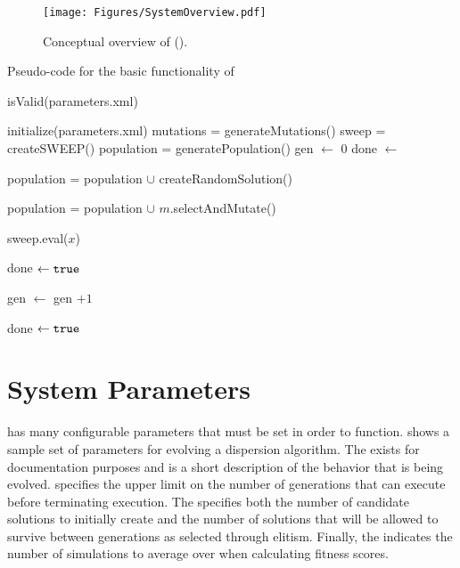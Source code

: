 \begin{figure}[ht]
  \centering
  \texttt{[image: Figures/SystemOverview.pdf]}
  \caption{Conceptual overview of \ECS (\ECSexp).}
  \label{fig:SystemOverview}
\end{figure}	

\begin{algorithm}[ht]
  \caption{Pseudo-code for the basic functionality of \ECS{}}
  \label{alg:ECS}
  \begin{algorithmic}[1]
    \REQUIRE isValid(parameters.xml)
    
    \STATE initialize(parameters.xml)
    \STATE mutations = generateMutations()
    \STATE sweep = createSWEEP()	
    \STATE population = generatePopulation()
    \STATE gen  $\leftarrow$ 0
    \STATE done $\leftarrow$ \false{}
    
    \STATE population = population $\cup$ createRandomSolution() 
    
    \STATE population = population $\cup$ $m$.selectAndMutate()
    \ENDFOR
    
    \STATE sweep.eval($x$)
    \ENDFOR
    
    \STATE done $\leftarrow \texttt{true}{}$
    \ENDIF
    
    \STATE gen $\leftarrow$ gen $+ 1$
    
    \STATE done $\leftarrow \texttt{true}{}$
    \ENDIF
    \ENDWHILE
  \end{algorithmic}
\end{algorithm}

\section{System Parameters}
\label{sec:system-parameters}

\ECS{} has many configurable parameters that must be set in order to function.   shows a sample set of parameters for evolving a dispersion algorithm.  The  exists for documentation purposes and is a short description of the behavior that is being evolved.   specifies the upper limit on the number of generations that \ECS{} can execute before terminating execution.  The  specifies both the number of candidate solutions to initially create and the number of solutions that will be allowed to survive between generations as selected through elitism.  Finally, the  indicates the number of \SWEEP{} simulations to average over when calculating fitness scores.  

